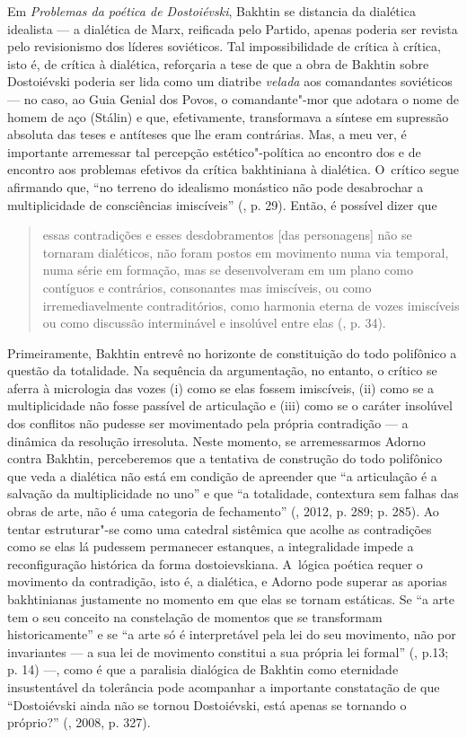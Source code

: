 Em \emph{Problemas da poética de Dostoiévski}, Bakhtin se distancia da
dialética idealista --- a dialética de Marx, reificada pelo Partido,
apenas poderia ser revista pelo revisionismo dos líderes soviéticos. Tal
impossibilidade de crítica à crítica, isto é, de crítica à dialética,
reforçaria a tese de que a obra de Bakhtin sobre Dostoiévski poderia ser
lida como um diatribe \emph{velada} aos comandantes soviéticos --- no
caso, ao Guia Genial dos Povos, o comandante"-mor que adotara o nome de
homem de aço (Stálin) e que, efetivamente, transformava a síntese em
supressão absoluta das teses e antíteses que lhe eram contrárias. Mas, a
meu ver, é importante arremessar tal percepção estético"-política ao
encontro dos e de encontro aos problemas efetivos da crítica bakhtiniana
à dialética. O~crítico segue afirmando que, ``no terreno do idealismo
monástico não pode desabrochar a multiplicidade de consciências
imiscíveis'' (, p. 29). Então, é possível dizer que

\begin{quote}
essas contradições e esses desdobramentos {[}das personagens{]} não se
tornaram dialéticos, não foram postos em movimento numa via temporal,
numa série em formação, mas se desenvolveram em um plano como contíguos
e contrários, consonantes mas imiscíveis, ou como irremediavelmente
contraditórios, como harmonia eterna de vozes imiscíveis ou como
discussão interminável e insolúvel entre elas (, p. 34).
\end{quote}

Primeiramente, Bakhtin entrevê no horizonte de constituição do todo
polifônico a questão da totalidade. Na sequência da argumentação, no
entanto, o crítico se aferra à micrologia das vozes (i) como se elas
fossem imiscíveis, (ii) como se a multiplicidade não fosse passível de
articulação e (iii) como se o caráter insolúvel dos conflitos não
pudesse ser movimentado pela própria contradição --- a dinâmica da
resolução irresoluta. Neste momento, se arremessarmos Adorno contra
Bakhtin, perceberemos que a tentativa de construção do todo polifônico
que veda a dialética não está em condição de apreender que ``a
articulação é a salvação da multiplicidade no uno'' e que ``a
totalidade, contextura sem falhas das obras de arte, não é uma categoria
de fechamento'' (, 2012, p. 289; p. 285). Ao tentar estruturar"-se
como uma catedral sistêmica que acolhe as contradições como se elas lá
pudessem permanecer estanques, a integralidade impede a reconfiguração
histórica da forma dostoievskiana. A~lógica poética requer o movimento
da contradição, isto é, a dialética, e Adorno pode superar as aporias
bakhtinianas justamente no momento em que elas se tornam estáticas. Se
``a arte tem o seu conceito na constelação de momentos que se
transformam historicamente'' e se ``a arte só é interpretável pela lei
do seu movimento, não por invariantes --- a sua lei de movimento
constitui a sua própria lei formal'' (, p.13; p. 14) ---, como é que
a paralisia dialógica de Bakhtin como eternidade insustentável da
tolerância pode acompanhar a importante constatação de que ``Dostoiévski
ainda não se tornou Dostoiévski, está apenas se tornando o próprio?''
(, 2008, p. 327).

